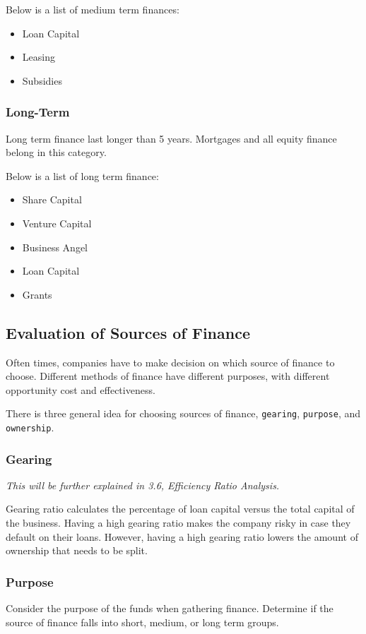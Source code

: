 \documentclass{standalone}
\begin{document}
Below is a list of medium term finances:
\begin{itemize}
    \item Loan Capital
    \item Leasing
    \item Subsidies
\end{itemize}

\subsubsection{Long-Term}
Long term finance last longer than 5 years.
Mortgages and all equity finance belong in this category.

Below is a list of long term finance:
\begin{itemize}
    \item Share Capital
    \item Venture Capital
    \item Business Angel
    \item Loan Capital
    \item Grants
\end{itemize}

\subsection{Evaluation of Sources of Finance}
Often times, companies have to make decision on which source of finance to choose.
Different methods of finance have different purposes, with different opportunity cost and effectiveness.

There is three general idea for choosing sources of finance, \texttt{gearing}, \texttt{purpose}, and \texttt{ownership}.

\subsubsection{Gearing}
\textit{This will be further explained in 3.6, Efficiency Ratio Analysis.}

Gearing ratio calculates the percentage of loan capital versus the total capital of the business.
Having a high gearing ratio makes the company risky in case they default on their loans.
However, having a high gearing ratio lowers the amount of ownership that needs to be split.

\subsubsection{Purpose}
Consider the purpose of the funds when gathering finance.
Determine if the source of finance falls into short, medium, or long term groups.
\end{document}
